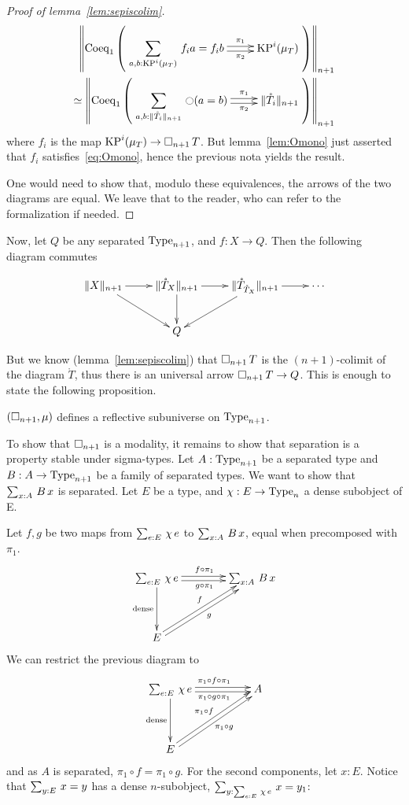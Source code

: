 \begin{proof}[Proof of lemma~\ref{lem:sepiscolim}]
  \[
    \begin{split}
    \left\|\mathrm{Coeq}_1 \left( 
      \xymatrix{
        \displaystyle{\sumD {a,b}{\KP^i(\mu_T)} {f_{i} a = f_{i} b}} \ar@<-.5ex>[r]_-{\pi_2} \ar@<.5ex>[r]^-{\pi_1} & \KP^i(\mu_T)
      }
    \right)\right\|_{n+1}
    \\ \simeq 
    \left\|\mathrm{Coeq}_1 \left( 
      \xymatrix{\displaystyle{\sumD {a,b} {\|\mathring T_i\|_{n+1}} {\modal (a=b)}} \ar@<-.5ex>[r]_-{\pi_2} \ar@<.5ex>[r]^-{\pi_1} & \|\mathring T_i\|_{n+1}}
    \right)\right\|_{n+1}
    \end{split}
  \]
  where $f_{i}$ is the map $\operatorname{KP}^i(\mu_T) \to \mathop{\square_{n+1}} T$. But
  lemma~\ref{lem:Omono} just asserted that $f_i$
  satisfies~\ref{eq:Omono}, hence the previous nota yields the result.
  
  One would need to show that, modulo these equivalences, the arrows
  of the two diagrams are equal. We leave that to the reader, who can
  refer to the formalization if needed.
\end{proof}

Now, let $Q$ be any separated $\operatorname{Type}_{n+1}$, and $f:X \to Q$. Then the
following diagram commutes

\[\xymatrix{
\|X\|_{n+1} \ar[r] \ar[rd] & \|\mathring T_{X}\|_{n+1} \ar[r] \ar[d] & \|\mathring
  T_{\mathring T_X} \|_{n+1} \ar[ld] \ar[r] & \cdots \\
  & Q &&
} \]%

But we know (lemma~\ref{lem:sepiscolim}) that $\mathop{\square_{n+1}} T$ is the
$(n+1)$-colimit of the diagram $\mathring T$, thus there is an universal
arrow $\mathop{\square_{n+1}} T \to Q$.
%
This is enough to state the following proposition.
\begin{prop}
\label{prop:sep-subu}
  $(\mathop{\square_{n+1}},\mu)$ defines a reflective subuniverse on $\operatorname{Type}_{n+1}$.
\end{prop}

To show that $\mathop{\square_{n+1}}$ is a modality, it remains to show that
separation is a property stable under sigma-types.
%
Let $A:\operatorname{Type}_{n+1}$ be a separated type and $B:A \to \operatorname{Type}_{n+1}$ be a
family of separated types. We want to show that $\sum_{x:A}\, B\, x$ is separated. Let $E$
be a type, and $\chi:E\to\operatorname{Type}_n$ a dense subobject of E.

Let $f,g$ be two maps from $\sum_{e:E}\, \chi\,e$ to $\sum_{x:A}\, B\, x$, equal when precomposed with $\pi_1$.
\[\xymatrix @R=4em @C=4em{
  \sumD e E {\chi\, e} \ar@<-2pt>[r]_{g\circ\pi_1}
  \ar@<2pt>[r]^{f\circ \pi_1} \ar[d]_{\mathrm{dense}}& \sumD x A {B\, x} \\
  E \ar@<-2pt>[ru]_{g} \ar@<2pt>[ru]^{f}&
}\]%
We can restrict the previous diagram to 
\[\xymatrix @R=4em @C=5em{
  \sumD e E {\chi\, e} \ar@<-2pt>[r]_{\pi_1\circ g\circ\pi_1} \ar@<2pt>[r]^{\pi_1\circ f\circ \pi_1} \ar[d]_{\mathrm{dense}}& A \\
  E \ar@<-2pt>[ru]_{\pi_1\circ g} \ar@<2pt>[ru]^{\pi_1\circ f}&
}\]%
and as $A$ is separated, $\pi_1\circ f = \pi_1 \circ g$.
For the second components, let $x:E$. Notice that 
$\sum_{y:E}\, x = y$ has a dense $n$-subobject, $\sum_{y:\sum_{e:E}\, \chi\,
  e}\, x=y_1$:

